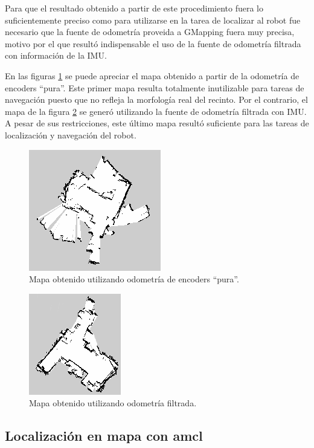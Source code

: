 Para que el resultado obtenido a partir de este procedimiento fuera lo suficientemente preciso como para utilizarse en la tarea de localizar al robot fue necesario que la fuente de odometría proveida a GMapping fuera muy precisa, motivo por el que resultó indispensable el uso de la fuente de odometría filtrada con información de la IMU.

En las figuras \ref{fig:mapaFeo} se puede apreciar el mapa obtenido a partir de la odometría de encoders ``pura''. Este primer mapa resulta totalmente inutilizable para tareas de navegación puesto que no refleja la morfología real del recinto. Por el contrario, el mapa de la figura \ref{fig:mapaLindo} se generó utilizando la fuente de odometría filtrada con IMU. A pesar de sus restricciones, este último mapa resultó suficiente para las tareas de localización y navegación del robot.

\begin{figure}[ht]
    \centering
    \includegraphics[scale=1.0]{./Figures/mapa_feo.png}
    \caption{Mapa obtenido utilizando odometría de encoders ``pura''.}
    \label{fig:mapaFeo}
\end{figure}

\begin{figure}[ht]
    \centering
    \includegraphics[scale=1.2]{./Figures/mapa_lindo.png}
    \caption{Mapa obtenido utilizando odometría filtrada.}
    \label{fig:mapaLindo}
\end{figure}

\subsection{Localización en mapa con amcl}

